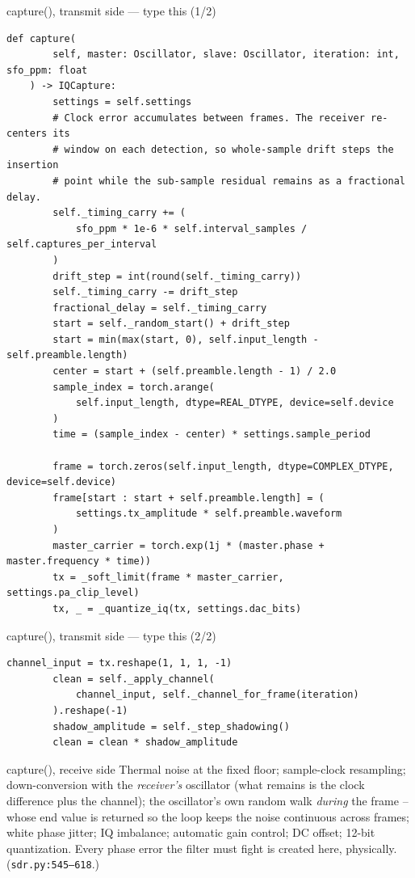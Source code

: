 \documentclass[10pt]{beamer}
\begin{document}
\begin{frame}[fragile]{capture(), transmit side --- type this (1/2)}
\begin{lstlisting}[basicstyle=\ttfamily\tiny]
    def capture(
        self, master: Oscillator, slave: Oscillator, iteration: int, sfo_ppm: float
    ) -> IQCapture:
        settings = self.settings
        # Clock error accumulates between frames. The receiver re-centers its
        # window on each detection, so whole-sample drift steps the insertion
        # point while the sub-sample residual remains as a fractional delay.
        self._timing_carry += (
            sfo_ppm * 1e-6 * self.interval_samples / self.captures_per_interval
        )
        drift_step = int(round(self._timing_carry))
        self._timing_carry -= drift_step
        fractional_delay = self._timing_carry
        start = self._random_start() + drift_step
        start = min(max(start, 0), self.input_length - self.preamble.length)
        center = start + (self.preamble.length - 1) / 2.0
        sample_index = torch.arange(
            self.input_length, dtype=REAL_DTYPE, device=self.device
        )
        time = (sample_index - center) * settings.sample_period

        frame = torch.zeros(self.input_length, dtype=COMPLEX_DTYPE, device=self.device)
        frame[start : start + self.preamble.length] = (
            settings.tx_amplitude * self.preamble.waveform
        )
        master_carrier = torch.exp(1j * (master.phase + master.frequency * time))
        tx = _soft_limit(frame * master_carrier, settings.pa_clip_level)
        tx, _ = _quantize_iq(tx, settings.dac_bits)
\end{lstlisting}
\end{frame}

\begin{frame}[fragile]{capture(), transmit side --- type this (2/2)}
\begin{lstlisting}[basicstyle=\ttfamily\scriptsize]
        channel_input = tx.reshape(1, 1, 1, -1)
        clean = self._apply_channel(
            channel_input, self._channel_for_frame(iteration)
        ).reshape(-1)
        shadow_amplitude = self._step_shadowing()
        clean = clean * shadow_amplitude
\end{lstlisting}
\end{frame}

\begin{frame}{capture(), receive side}
  Thermal noise at the fixed floor; sample-clock resampling;
  down-conversion with the \emph{receiver's} oscillator (what
  remains is the clock difference plus the channel); the
  oscillator's own random walk \emph{during} the frame -- whose
  end value is returned so the loop keeps the noise continuous
  across frames; white phase jitter; IQ imbalance; automatic
  gain control; DC offset; 12-bit quantization. Every phase
  error the filter must fight is created here, physically.
  (\texttt{sdr.py:545--618}.)
\end{frame}
\end{document}
